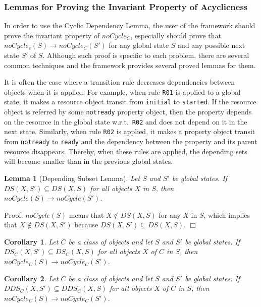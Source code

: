 \documentclass[12pt]{report}
\newtheorem{lemma}{Lemma}
\newtheorem{corollary}{Corollary}
\newcommand{\ra}{\rightarrow}
\begin{document}
\subsubsection{Lemmas for Proving the Invariant Property of Acyclicness}
In order to use the Cyclic Dependency Lemma, the user of the framework
should prove the invariant property of $noCycle_C$, especially should
prove that $noCycle_c(S) \ra noCycle_C(S')$ for any global state $S$
and any possible next state $S'$ of $S$. Although such proof is
specific to each problem, there are several common techniques and the
framework provides several proved lemmas for them.

It is often the case where a transition rule decreases dependencies
between objects when it is applied. For example, when rule {\tt R01}
is applied to a global state, it makes a resource object transit from
{\tt initial} to {\tt started}. If the resource object is referred by
some {\tt notready} property object, then the property depends on the
resource in the global state w.r.t.\ {\tt R02} and does not depend on it in the
next state. Similarly, when rule {\tt R02} is applied, it makes a
property object transit from {\tt notready} to {\tt ready} and the
dependency between the property and its parent resource disappears.
Thereby, when these rules are applied, the depending sets will become
smaller than in the previous global states.

\begin{lemma}[Depending Subset Lemma]
Let $S$ and $S'$ be global states.  If $DS(X,S')\subseteq DS(X,S)$ for all
objects $X$ in $S$, then $noCycle(S) \ra noCycle(S')$.
\end{lemma}
Proof: $noCycle(S)$ means that $X\not\in DS(X,S)$ for any $X$ in $S$,
which implies that $X\not\in DS(X,S')$ because $DS(X,S')\subseteq
DS(X,S)$.  $\Box$

\begin{corollary}
Let $C$ be a class of objects and let $S$ and $S'$ be global states.  If
$\mathit{DS_C}(X,S')\subseteq \mathit{DS_C}(X,S)$ for all objects $X$ of $C$ in $S$,
then $noCycle_C(S) \ra noCycle_C(S')$.
\end{corollary}

\begin{corollary}
Let $C$ be a class of objects and let $S$ and $S'$ be global states.  If
$\mathit{DDS_C}(X,S')\subseteq \mathit{DDS_C}(X,S)$ for all objects $X$ of $C$ in $S$,
then $noCycle_C(S) \ra noCycle_C(S')$.
\end{corollary}
\end{document}
